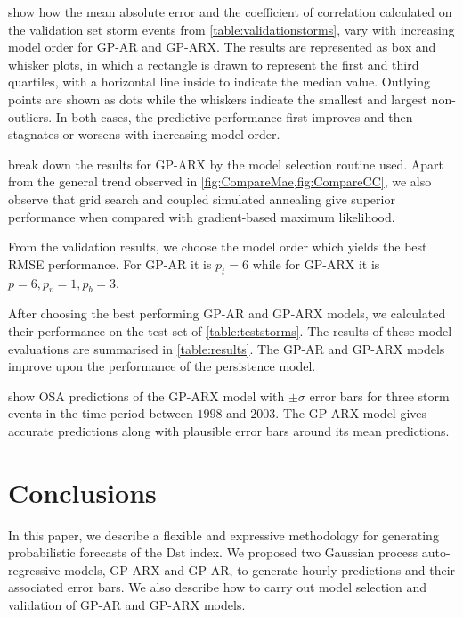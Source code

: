  show how the mean absolute error and the coefficient of correlation 
calculated on the validation set storm events from \cref{table:validationstorms}, vary with 
increasing model order for GP-AR and GP-ARX. The results are represented as box and whisker plots, 
in which a rectangle is drawn to represent the first and third quartiles, with a horizontal line 
inside to indicate the median value. Outlying points are shown as dots while the whiskers indicate 
the smallest and largest non-outliers. In both cases, the predictive performance first improves and 
then stagnates or worsens with increasing model order. 

 break down the results for GP-ARX by the model selection 
routine used. Apart from the general trend observed in \cref{fig:CompareMae,fig:CompareCC}, we also 
observe that grid search and coupled simulated annealing give superior performance when 
compared with gradient-based maximum likelihood.

From the validation results, we choose the model order which yields the best RMSE performance. For 
GP-AR it is $p_t = 6$ while for GP-ARX it is $p = 6, p_v = 1, p_b = 3$.

After choosing the best performing GP-AR and GP-ARX models, we calculated their performance on the 
test set of \cref{table:teststorms}. The results of these model evaluations are summarised in 
\cref{table:results}. The GP-AR and GP-ARX models improve upon the performance of the 
persistence model.

 show OSA predictions of the GP-ARX model 
with $\pm \sigma$ error bars for three storm events in the time period between $1998$ and $2003$. 
The GP-ARX model gives accurate predictions along with plausible error bars around its mean 
predictions.

\section{Conclusions}

In this paper, we describe a flexible and expressive methodology for generating probabilistic 
forecasts of the $\mathrm{Dst}$ index. We proposed two Gaussian process auto-regressive 
models, GP-ARX and GP-AR, to generate hourly predictions and their associated error 
bars. We also describe how to carry out model selection and validation of GP-AR and GP-ARX models.



